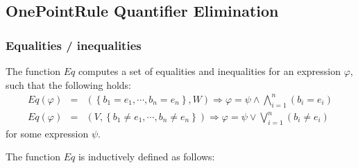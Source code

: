 \subsection{OnePointRule Quantifier Elimination}

\subsubsection{Equalities / inequalities}

The function $Eq$ computes a set of equalities and inequalities for an
expression $\varphi $, such that the following holds:%
\begin{eqnarray*}
Eq\left( \varphi \right)  &=&\left( \left\{ b_{1}=e_{1},\cdots
,b_{n}=e_{n}\right\} ,W\right) \Rightarrow \varphi =\psi \wedge
\bigwedge\limits_{i=1}^{n}\left( b_{i}=e_{i}\right)  \\
Eq\left( \varphi \right)  &=&\left( V,\left\{ b_{1}\neq e_{1},\cdots
,b_{n}\neq e_{n}\right\} \right) \Rightarrow \varphi =\psi \vee
\bigvee\limits_{i=1}^{n}\left( b_{i}\neq e_{i}\right)
\end{eqnarray*}%
for some expression $\psi $.

The function $Eq$ is inductively defined as follows:

